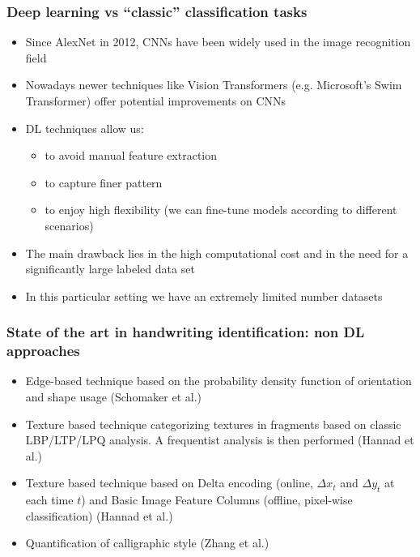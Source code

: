 \documentclass{beamer}
\begin{document}
\begin{frame}
	\frametitle{Deep learning vs ``classic'' classification tasks}
	\begin{itemize}
		\item Since AlexNet in 2012, CNNs have been widely used in the image recognition field
		\item Nowadays newer techniques like Vision Transformers (e.g. Microsoft's Swim Transformer) offer potential improvements on CNNs
		\item DL techniques allow us:
		\begin{itemize}
			\item to avoid manual feature extraction
			\item to capture finer pattern
			\item to enjoy high flexibility (we can fine-tune models according to different scenarios)
		\end{itemize}
		\item The main drawback lies in the high computational cost and in the need for a significantly large labeled data set
		\item In this particular setting we have an extremely limited number datasets
	\end{itemize}
\end{frame}
\begin{frame}
	\frametitle{State of the art in handwriting identification: non DL approaches}
	\begin{itemize}
		\item Edge-based technique based on the probability density function of orientation and shape usage (Schomaker et al.)
		\item Texture based technique categorizing textures in fragments based on classic LBP/LTP/LPQ analysis. A frequentist analysis is then performed (Hannad et al.)
		\item Texture based technique based on Delta encoding (online, $\Delta x_{t}$ and $\Delta y_{t}$ at each time $t$) and Basic Image Feature Columns (offline, pixel-wise classification) (Hannad et al.)
		\item Quantification of calligraphic style (Zhang et al.)
	\end{itemize}
\end{frame}
\end{document}
